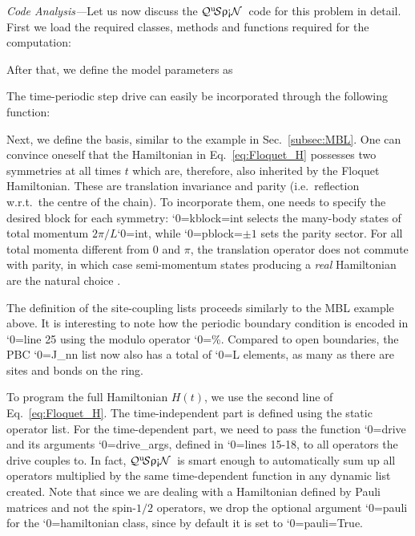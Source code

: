 \documentclass{SciPost}
\newcommand\0{\scalebox{-1}[1]{0}}
\let\svttfamily\ttfamily
\renewcommand\ttfamily{\svttfamily\catcode`0=\active }
\renewcommand\texttt{\bgroup\ttfamily\texttthelp}
\def\texttthelp#1{#1\egroup}
\newcommand{\qspin}{$\mathcal{Q}^{\mathrm{u}}\!\mathcal{S}\uprho\mathrm{\text{\textexclamdown}}\mathcal{N}$}
\begin{document}
\emph{Code Analysis---}Let us now discuss the \qspin\ code for this problem in detail. First we load the required classes, methods and functions required for the computation:

%
After that, we define the model parameters as

%
The time-periodic step drive can easily be incorporated through the following function: 

Next, we define the basis, similar to the example in Sec.~\ref{subsec:MBL}. One can convince oneself that the Hamiltonian in Eq.~\eqref{eq:Floquet_H} possesses two symmetries at all times $t$ which are, therefore, also inherited by the Floquet Hamiltonian. These are translation invariance and parity (i.e.~reflection w.r.t.~the centre of the chain). To incorporate them, one needs to specify the desired block for each symmetry: \texttt{kblock=int} selects the many-body states of total momentum $2\pi/L$\texttt{*int}, while \texttt{pblock=$\pm 1$} sets the parity sector. For all total momenta different from $0$ and $\pi$, the translation operator does not commute with parity, in which case semi-momentum states producing a \emph{real} Hamiltonian are the natural choice \cite{anders10}.
%

The definition of the site-coupling lists proceeds similarly to the MBL example above. It is interesting to note how the periodic boundary condition is encoded in \texttt{line 25} using the modulo operator \texttt{\%}. Compared to open boundaries, the PBC \texttt{J\_nn} list now also has a total of \texttt{L} elements, as many as there are sites and bonds on the ring.
% 

To program the full Hamiltonian $H(t)$, we use the second line of Eq.~\eqref{eq:Floquet_H}. The time-independent part is defined using the static operator list. For the time-dependent part, we need to pass the function \texttt{drive} and its arguments \texttt{drive\_args}, defined in \texttt{lines 15-18}, to all operators the drive couples to. In fact, \qspin\ is smart enough to automatically sum up all operators multiplied by the same time-dependent function in any dynamic list created. Note that since we are dealing with a Hamiltonian defined by Pauli matrices and not the spin-$1/2$ operators, we drop the optional argument \texttt{pauli} for the \texttt{hamiltonian} class, since by default it is set to \texttt{pauli=True}.
%

\end{document}

